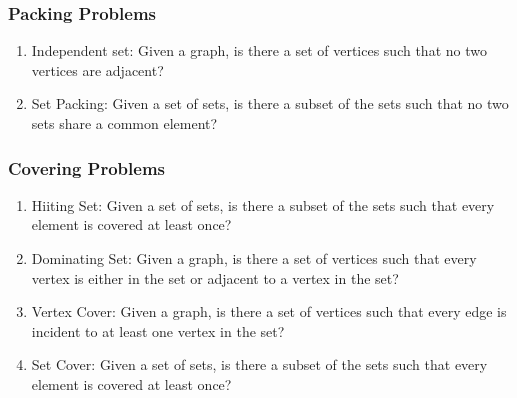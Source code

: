 \documentclass[conference]{IEEEtran}
\begin{document}
\subsubsection{Packing Problems}
\begin{enumerate}
    \item Independent set: Given a graph, is there a set of vertices such that no two vertices are adjacent?
    \item Set Packing: Given a set of sets, is there a subset of the sets such that no two sets share a common element?
\end{enumerate}
\subsubsection{Covering Problems}
\begin{enumerate}
    \item Hiiting Set: Given a set of sets, is there a subset of the sets such that every element is covered at least once?
    \item Dominating Set: Given a graph, is there a set of vertices such that every vertex is either in the set or adjacent to a vertex in the set?
    \item Vertex Cover: Given a graph, is there a set of vertices such that every edge is incident to at least one vertex in the set?
    \item Set Cover: Given a set of sets, is there a subset of the sets such that every element is covered at least once?
\end{enumerate}
\end{document}
